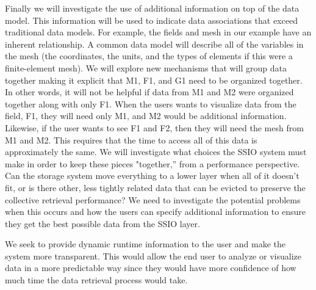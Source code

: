 Finally we will investigate the use of additional information
on top of the data model.
This information will be used to indicate data associations that exceed
traditional data models. For example, the fields and mesh in our example have
an inherent relationship. A common data model will describe all of the
variables in the mesh (the coordinates, the units, and the types of elements if
this were a finite-element mesh). We will explore new mechanisms that will
group data together making it explicit that M1, F1, and G1 need to be organized
together.  In other words, it will not be helpful if data from M1 and M2 were
organized together along with only F1. When the users wants to visualize data
from the field, F1, they will need only M1, and M2 would be additional
information. Likewise, if the user wants to see F1 and F2, then they will need
the mesh from M1 and M2. This requires that the time to access all of this
data is approximately the same.
We will investigate what choices the SSIO system must make in order to
keep these pieces "together,'' from a performance perspective. Can the storage
system move everything to a lower layer when all of it doesn't fit, or is there
other, less tightly related data that can be evicted to preserve the collective
retrieval performance?  We need to investigate the potential problems when this
occurs and how the users can specify additional information to ensure they get
the best possible data from the SSIO layer.

We seek to provide dynamic runtime information to the user and make the
system more transparent. This would allow the end user to analyze or
visualize data in a more
predictable way since they would have more confidence of how much time
the data retrieval process would take.

